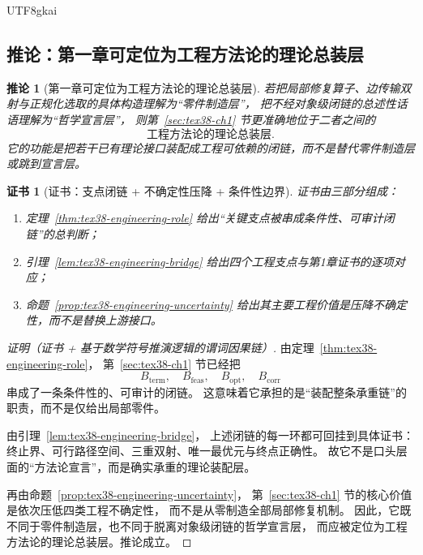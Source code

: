 \documentclass[12pt]{article}
\newtheorem{corollary}{推论}[section]
\newtheorem{Certificate}{证书}[section]
\begin{document}
\begin{CJK*}{UTF8}{gkai}
\subsection{推论：第一章可定位为工程方法论的理论总装层}
\label{subsec:tex38-engineering-corollary}

\begin{corollary}[第一章可定位为工程方法论的理论总装层]
\label{cor:tex38-engineering-assembly}
若把局部修复算子、边传输双射与正规化选取的具体构造理解为“零件制造层”，
把不经对象级闭链的总述性话语理解为“哲学宣言层”，
则第~\ref{sec:tex38-ch1} 节更准确地位于二者之间的
\[
  \text{工程方法论的理论总装层}.
\]
它的功能是把若干已有理论接口装配成工程可依赖的闭链，而不是替代零件制造层或跳到宣言层。
\end{corollary}

\begin{Certificate}[证书：支点闭链 + 不确定性压降 + 条件性边界]
\label{cert:tex38-engineering-assembly}
证书由三部分组成：
\begin{enumerate}
  \item 定理~\ref{thm:tex38-engineering-role} 给出“关键支点被串成条件性、可审计闭链”的总判断；
  \item 引理~\ref{lem:tex38-engineering-bridge} 给出四个工程支点与第1章证书的逐项对应；
  \item 命题~\ref{prop:tex38-engineering-uncertainty} 给出其主要工程价值是压降不确定性，而不是替换上游接口。
\end{enumerate}
\end{Certificate}

\begin{proof}[证明（证书 + 基于数学符号推演逻辑的谓词因果链）]
由定理~\ref{thm:tex38-engineering-role}，
第~\ref{sec:tex38-ch1} 节已经把
\[
  B_{\mathrm{term}},\quad
  B_{\mathrm{feas}},\quad
  B_{\mathrm{opt}},\quad
  B_{\mathrm{corr}}
\]
串成了一条条件性的、可审计的闭链。
这意味着它承担的是“装配整条承重链”的职责，而不是仅给出局部零件。

由引理~\ref{lem:tex38-engineering-bridge}，
上述闭链的每一环都可回挂到具体证书：
终止界、可行路径空间、三重双射、唯一最优元与终点正确性。
故它不是口头层面的“方法论宣言”，而是确实承重的理论装配层。

再由命题~\ref{prop:tex38-engineering-uncertainty}，
第~\ref{sec:tex38-ch1} 节的核心价值是依次压低四类工程不确定性，
而不是从零制造全部局部修复机制。
因此，它既不同于零件制造层，也不同于脱离对象级闭链的哲学宣言层，
而应被定位为工程方法论的理论总装层。推论成立。
\end{proof}


\end{CJK*}
\end{document}
